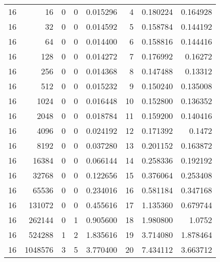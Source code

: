 \begin{longtable}[c]{@{}rrrrrrrr@{}}
    16        & 16        & 0         & 0        & 0.015296    & 4                   & 0.180224    & 0.164928   \\
    16        & 32        & 0         & 0        & 0.014592    & 5                   & 0.158784    & 0.144192   \\
    16        & 64        & 0         & 0        & 0.014400    & 6                   & 0.158816    & 0.144416   \\
    16        & 128       & 0         & 0        & 0.014272    & 7                   & 0.176992    & 0.16272    \\
    16        & 256       & 0         & 0        & 0.014368    & 8                   & 0.147488    & 0.13312    \\
    16        & 512       & 0         & 0        & 0.015232    & 9                   & 0.150240    & 0.135008   \\
    16        & 1024      & 0         & 0        & 0.016448    & 10                  & 0.152800    & 0.136352   \\
    16        & 2048      & 0         & 0        & 0.018784    & 11                  & 0.159200    & 0.140416   \\
    16        & 4096      & 0         & 0        & 0.024192    & 12                  & 0.171392    & 0.1472     \\
    16        & 8192      & 0         & 0        & 0.037280    & 13                  & 0.201152    & 0.163872   \\
    16        & 16384     & 0         & 0        & 0.066144    & 14                  & 0.258336    & 0.192192   \\
    16        & 32768     & 0         & 0        & 0.122656    & 15                  & 0.376064    & 0.253408   \\
    16        & 65536     & 0         & 0        & 0.234016    & 16                  & 0.581184    & 0.347168   \\
    16        & 131072    & 0         & 0        & 0.455616    & 17                  & 1.135360    & 0.679744   \\
    16        & 262144    & 0         & 1        & 0.905600    & 18                  & 1.980800    & 1.0752     \\
    16        & 524288    & 1         & 2        & 1.835616    & 19                  & 3.714080    & 1.878464   \\
    16        & 1048576   & 3         & 5        & 3.770400    & 20                  & 7.434112    & 3.663712   \\

\end{longtable}

